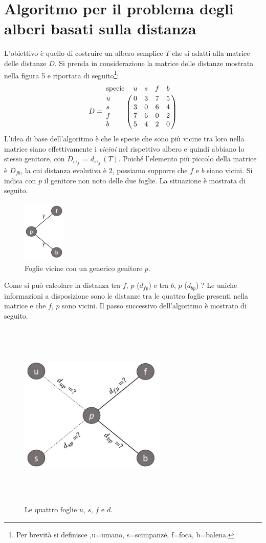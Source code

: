 \section{Algoritmo per il problema degli alberi basati sulla distanza}
L'obiettivo è quello di costruire un albero semplice $T$ che si adatti alla matrice delle distanze $D$.
\newline
Si prenda in considerazione la matrice delle distanze mostrata nella figura 5 e riportata di seguito\footnote{Per brevità si definisce ,u=umano, s=scimpanzé, f=foca, b=balena.}:
\[
D = \bordermatrix{\text{specie}&u&s&f&b\cr
                u& 0 & 3 & 7 & 5\cr
                s& 3 & 0 & 6 & 4\cr
                f& 7 & 6 & 0 & 2\cr
                b& 5 & 4 & 2 & 0}
\]
\newline
L'idea di base dell'algoritmo è che le specie che sono più vicine tra loro nella matrice siano effettivamente i \textit{vicini} nel rispettivo albero e quindi abbiano lo stesso genitore, con $D_i,_j=d_i,_j(T)$.
\newline
Poiché l'elemento più piccolo della matrice è $D_{fb}$, la cui distanza evolutiva è $2$, possiamo supporre che $f$ e $b$ siano vicini. Si indica con $p$ il genitore non noto delle due foglie. La situazione è mostrata di seguito.
\begin{figure}[h!]
\centering
	\includegraphics[height=3cm, width=2cm]{distance_between_f_b.jpg}
 	\caption{Foglie vicine con un generico genitore $p$.}
  	\label{fig:neighborsleaves}
\end{figure}
\newline
Come si può calcolare la distanza tra $f$, $p$ ($d_{fp}$) e tra $b$, $p$ ($d_{bp}$) ? Le uniche informazioni a disposizione sono le distanze tra le quattro foglie presenti nella matrice e che $f$, $p$ sono vicini. Il passo successivo dell'algoritmo è mostrato di seguito.
\begin{figure}[h!]
\centering
	\includegraphics[height=9cm, width=7cm, keepaspectratio]{distance_between_f_b_part_2.jpg}
 	\caption{Le quattro foglie $u$, $s$, $f$ e $d$.}
  	\label{fig:neighborsleaves_2}
\end{figure}
